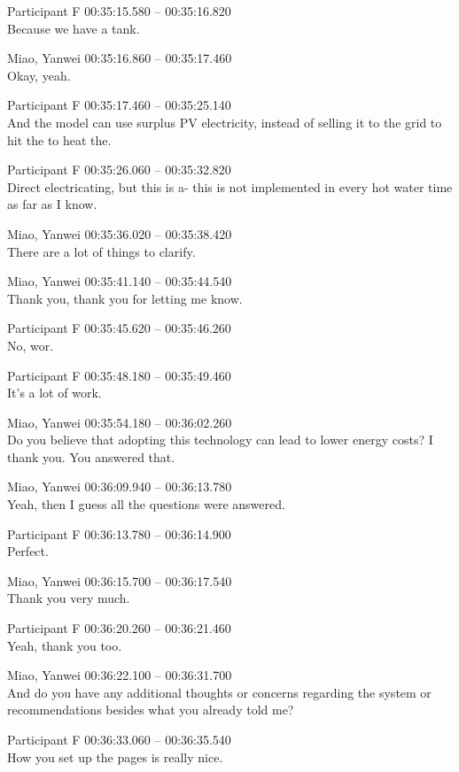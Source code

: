 {Participant F 00:35:15.580 -- 00:35:16.820 \\
Because we have a tank.

Miao, Yanwei 00:35:16.860 -- 00:35:17.460 \\
Okay, yeah.

Participant F 00:35:17.460 -- 00:35:25.140 \\
And the model can use surplus PV electricity, instead of selling it to the grid to hit the to heat the.

Participant F 00:35:26.060 -- 00:35:32.820 \\
Direct electricating, but this is a- this is not implemented in every hot water time as far as I know.

Miao, Yanwei 00:35:36.020 -- 00:35:38.420 \\
There are a lot of things to clarify.

Miao, Yanwei 00:35:41.140 -- 00:35:44.540 \\
Thank you, thank you for letting me know.

Participant F 00:35:45.620 -- 00:35:46.260 \\
No, wor.

Participant F 00:35:48.180 -- 00:35:49.460 \\
It's a lot of work.

Miao, Yanwei 00:35:54.180 -- 00:36:02.260 \\
Do you believe that adopting this technology can lead to lower energy costs? I thank you. You answered that.

Miao, Yanwei 00:36:09.940 -- 00:36:13.780 \\
Yeah, then I guess all the questions were answered.

Participant F 00:36:13.780 -- 00:36:14.900 \\
Perfect.

Miao, Yanwei 00:36:15.700 -- 00:36:17.540 \\
Thank you very much.

Participant F 00:36:20.260 -- 00:36:21.460 \\
Yeah, thank you too.

Miao, Yanwei 00:36:22.100 -- 00:36:31.700 \\
And do you have any additional thoughts or concerns regarding the system or recommendations besides what you already told me?

Participant F 00:36:33.060 -- 00:36:35.540 \\
How you set up the pages is really nice.

}
